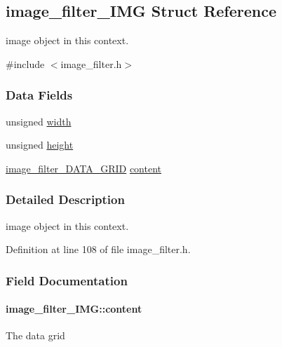 \hypertarget{a00004}{\subsection{image\-\_\-filter\-\_\-\-I\-M\-G Struct Reference}
\label{a00004}
}


image object in this context.  




{\ttfamily \#include $<$image\-\_\-filter.\-h$>$}

\subsubsection*{Data Fields}
\begin{DoxyCompactItemize}
\item 
unsigned \hyperlink{a00004_ac0b6deb570d85ea8e2fa54974b421598}{width}
\item 
unsigned \hyperlink{a00004_a96a2da8de6bd5ff8884dc8a673b2dd8a}{height}
\item 
\hyperlink{a00012_a1505c2ea7ed5ea8156460fa804a43730}{image\-\_\-filter\-\_\-\-D\-A\-T\-A\-\_\-\-G\-R\-I\-D} \hyperlink{a00004_a677eab141bbe72423b97a2447467428b}{content}
\end{DoxyCompactItemize}


\subsubsection{Detailed Description}
image object in this context. 

Definition at line 108 of file image\-\_\-filter.\-h.



\subsubsection{Field Documentation}
\hypertarget{a00004_a677eab141bbe72423b97a2447467428b}{
\paragraph[{content}]{ image\-\_\-filter\-\_\-\-I\-M\-G\-::content}}\label{a00004_a677eab141bbe72423b97a2447467428b}
The data grid 

